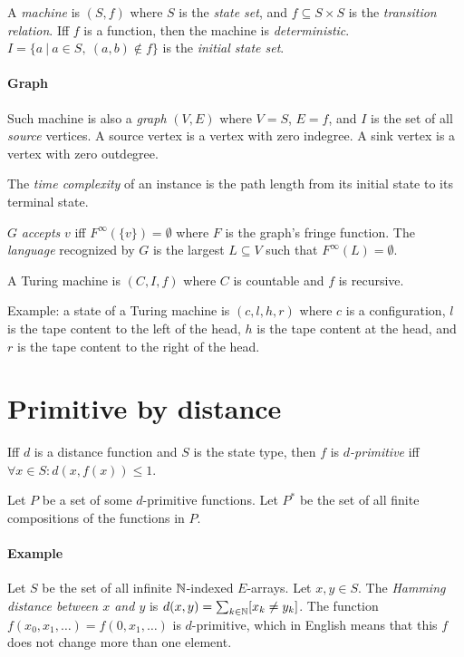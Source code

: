 A \emph{machine} is \((S,f)\)
where \(S\) is the \emph{state set},
and \(f \subseteq S \times S\) is the \emph{transition relation}.
Iff \(f\) is a function, then the machine is \emph{deterministic}.
\(I = \{ a ~|~ a \in S, ~ (a,b) \not\in f \}\) is the \emph{initial state set}.

\paragraph{Graph}
Such machine is also a \emph{graph} \((V,E)\) where \(V=S\), \(E = f\),
and \(I\) is the set of all \emph{source} vertices.
A source vertex is a vertex with zero indegree.
A sink vertex is a vertex with zero outdegree.

The \emph{time complexity} of an instance is the path length from its initial state to its terminal state.

\(G\) \emph{accepts} \(v\) iff \(F^\infty(\{v\}) = \emptyset\) where \(F\) is the graph's fringe function.
The \emph{language} recognized by \(G\) is the largest \(L \subseteq V\) such that \(F^\infty(L) = \emptyset\).

A Turing machine is \((C,I,f)\)
where \(C\) is countable
and \(f\) is recursive.

Example: a state of a Turing machine is \((c,l,h,r)\)
where \(c\) is a configuration,
\(l\) is the tape content to the left of the head,
\(h\) is the tape content at the head,
and \(r\) is the tape content to the right of the head.

\section{Primitive by distance}

Iff \(d\) is a distance function and \(S\) is the state type,
then \(f\) is \emph{\(d\)-primitive} iff \(\forall x \in S : d(x,f(x)) \le 1\).

Let \(P\) be a set of some \(d\)-primitive functions.
Let \(P^*\) be the set of all finite compositions of the functions in \(P\).

\paragraph{Example}
Let \(S\) be the set of all infinite \(\mathbb{N}\)-indexed \(E\)-arrays.
Let \(x,y \in S\).
The \emph{Hamming distance between \(x\) and \(y\)} is
\(d(x,y) = \sum_{k\in\mathbb{N}} [x_k \neq y_k]\).
The function \(f(x_0,x_1,\ldots) = f(0,x_1,\ldots)\) is \(d\)-primitive,
which in English means that this \(f\) does not change more than one element.

